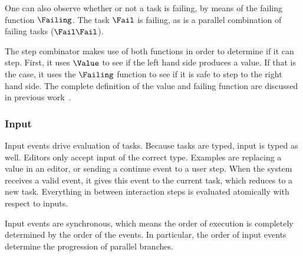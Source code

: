 One can also observe whether or not a task is failing, by means of the failing function $\Failing$.
The task $\Fail$ is failing, as is a parallel combination of failing tasks ($\Fail \And \Fail$).

The step combinator makes use of both functions in order to determine if it can step.
First, it uses $\Value$ to see if the left hand side produces a value.
If that is the case, it uses the $\Failing$ function to see if it is safe to step to the right hand side.
The complete definition of the value and failing function are discussed in previous work~\cite{Steenvoorden2019}.


\subsubsection{Input}

Input events drive evaluation of tasks.
Because tasks are typed, input is typed as well.
Editors only accept input of the correct type.
Examples are replacing a value in an editor,
or sending a continue event to a user step.
When the system receives a valid event, it gives this event to the current task, which reduces to a new task.
Everything in between interaction steps is evaluated atomically with respect to inputs.

Input events are synchronous, which means the order of execution is completely determined by the order of the events.
In particular, the order of input events determine the progression of parallel branches.
